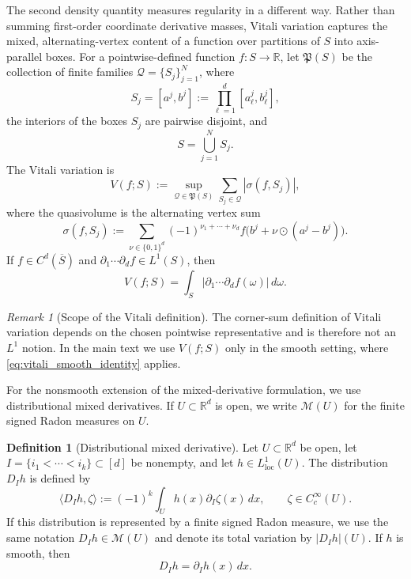 \documentclass[11pt,letterpaper]{article}
\theoremstyle{definition}
\newtheorem{definition}[theorem]{Definition}
\theoremstyle{remark}
\newtheorem{remark}[theorem]{Remark}
\begin{document}
The second density quantity measures regularity in a different way. Rather than
summing first-order coordinate derivative masses, Vitali variation captures the
mixed, alternating-vertex content of a function over partitions of $S$ into
axis-parallel boxes. For a pointwise-defined function $f:S\to\mathbb R$, let
$\mathfrak P(S)$ be the collection of finite families
$\mathcal Q=\{S_j\}_{j=1}^N$, where
$$
S_j=[a^j,b^j]
:=
\prod_{\ell=1}^d[a_\ell^j,b_\ell^j],
$$
the interiors of the boxes $S_j$ are pairwise disjoint, and
$$
S=\bigcup_{j=1}^N S_j.
$$
The Vitali variation is
\begin{equation}
\label{eq:def_vitali_variation}
V(f;S)
:=
\sup_{\mathcal Q\in\mathfrak P(S)}
\sum_{S_j\in\mathcal Q}|\sigma(f,S_j)|,
\end{equation}
where the quasivolume is the alternating vertex sum
\begin{equation}
\label{eq:def_quasivolume}
\sigma(f,S_j)
:=
\sum_{\nu\in\{0,1\}^d}
(-1)^{\nu_1+\cdots+\nu_d}
f\bigl(b^j+\nu\odot(a^j-b^j)\bigr).
\end{equation}
If $f\in C^d(\overline S)$ and
$\partial_1\cdots\partial_d f\in L^1(S)$, then
\begin{equation}
\label{eq:vitali_smooth_identity}
V(f;S)=\int_S|\partial_1\cdots\partial_d f(\omega)|\,d\omega .
\end{equation}

\begin{remark}[Scope of the Vitali definition]
\label{rem:vitali_scope}
The corner-sum definition of Vitali variation depends on the chosen pointwise
representative and is therefore not an $L^1$ notion. In the main text we use $V(f;S)$ only in the
smooth setting, where \eqref{eq:vitali_smooth_identity} applies.
\end{remark}

For the nonsmooth extension of the mixed-derivative formulation, we use
distributional mixed derivatives. If $U\subset\mathbb R^d$ is open, we write
$\mathcal M(U)$ for the finite signed Radon measures on $U$.

\begin{definition}[Distributional mixed derivative]
\label{def:distributional_mixed_derivative_main}
Let $U\subset\mathbb R^d$ be open, let
$I=\{i_1<\cdots<i_k\}\subset[d]$ be nonempty, and let
$h\in L^1_{\mathrm{loc}}(U)$. The distribution $D_Ih$ is defined by
$$
\langle D_Ih,\zeta\rangle
:=
(-1)^k\int_U h(x)\partial_I\zeta(x)\,dx,
\qquad
\zeta\in C_c^\infty(U).
$$
If this distribution is represented by a finite signed Radon measure, we use
the same notation $D_Ih\in\mathcal M(U)$ and denote its total variation by
$|D_Ih|(U)$. If $h$ is smooth, then
$$
D_Ih=\partial_Ih(x)\,dx.
$$
\end{definition}
\end{document}
